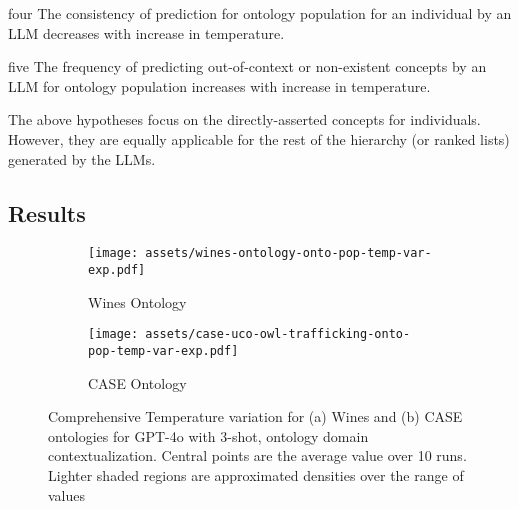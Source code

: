 \documentclass[a4paper,colorinlistoftodos]{article}
\begin{document}
\begin{hypothesis}{}{four}
  The consistency of prediction for ontology population for an individual by
  an LLM decreases with increase in temperature.
\end{hypothesis}

\begin{hypothesis}{}{five}
  The frequency of predicting out-of-context or non-existent concepts by an
  LLM for ontology population increases with increase in temperature.
\end{hypothesis}

The above hypotheses focus on the directly-asserted concepts for
individuals. However, they are equally applicable for the rest of the 
hierarchy (or ranked lists) generated by the LLMs.

\subsection{Results}
\label{subsec:new-temp-variation-results}

\begin{figure}
\begin{subfigure}{\textwidth} \centering
    \caption{Wines Ontology}
    \label{fig:new-wines-temp-variation}
    \texttt{[image: assets/wines-ontology-onto-pop-temp-var-exp.pdf]}
\end{subfigure} \hspace{0.2cm}
\begin{subfigure}{\textwidth} \centering
    \caption{CASE Ontology}
    \label{fig:new-case-temp-variation}
    \texttt{[image: assets/case-uco-owl-trafficking-onto-pop-temp-var-exp.pdf]}
\end{subfigure}
\caption{Comprehensive Temperature variation for (a) Wines and (b) CASE ontologies for
GPT-4o with 3-shot, ontology domain contextualization. Central
points are the average value over 10 runs. Lighter shaded regions are
approximated densities over the range of values}
\label{fig:new-temp-variation}
\end{figure}



\end{document}
